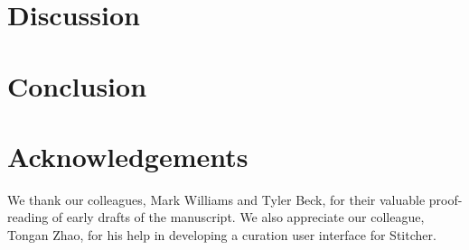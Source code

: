 \documentclass{bioinfo}
\begin{document}


\section{Discussion}


%
%

\section{Conclusion}


\section*{Acknowledgements}

We thank our colleagues, Mark Williams and Tyler Beck, for their valuable proof-reading of early drafts of the manuscript. We also appreciate our colleague, Tongan Zhao, for his help in developing a curation user interface for Stitcher.


%
%
%
%
%
%
%

\end{document}
